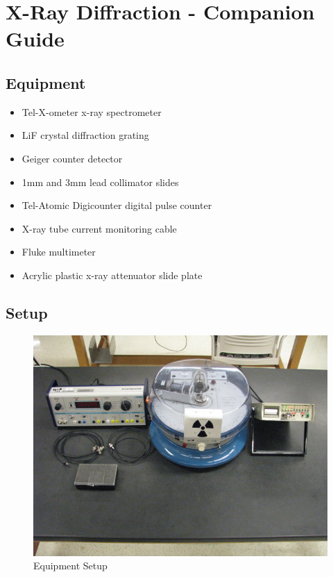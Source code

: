 \documentclass[justified]{tufte-book}
\begin{document}
\chapter{X-Ray Diffraction - Companion Guide}



\section{Equipment}

\begin{minipage}[t]{0.5\textwidth}
\begin{itemize}[noitemsep]
\item Tel-X-ometer x-ray spectrometer
\item LiF crystal diffraction grating
\item Geiger counter detector
\item 1mm and 3mm lead collimator slides
\end{itemize}
\end{minipage}
\begin{minipage}[t]{0.5\textwidth}
\begin{itemize}[noitemsep]
\item Tel-Atomic Digicounter digital pulse counter
\item X-ray tube current monitoring cable
\item Fluke multimeter
\item Acrylic plastic x-ray attenuator slide plate
\end{itemize}
\end{minipage}

\section{Setup}
\begin{figure}
\includegraphics{X-Ray-Diffraction-Setup.jpg}
\caption{Equipment Setup}
\label{pic:XRsetup}
\end{figure}
\end{document}
